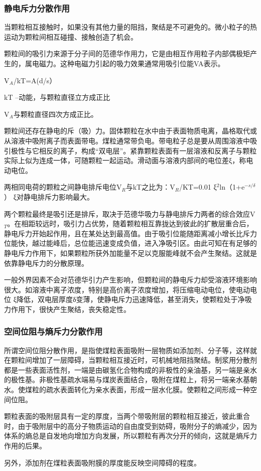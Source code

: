 \documentclass[10pt,openany]{ctexbook}
\begin{document}
 \subsubsection{静电斥力分散作用}
         当颗粒相互接触时，如果没有其他力量的阻挡，聚结是不可避免的。微小粒子的热运动为颗粒间相互碰撞、接触创造了机会。\par
       颗粒间的吸引力来源于分子间的范德华作用力，它是由相互作用粒子内部偶极矩产生的，属电磁力。这种电磁力引起的吸力效果通常用吸引位能VA表示。\par
V$_A$/kT=A(d/s）\par
kT –动能，与颗粒直径立方成正比\par
V$_A$与颗粒直径四次方成正比。\par
颗粒间还存在静电的斥（吸）力。固体颗粒在水中由于表面物质电离，晶格取代或从溶液中吸附离子而表面带电。煤粒通常带负电。带电粒子总是要从周围溶液中吸引极性与它相反的离子，构成“双电层”。紧靠颗粒表面有一层溶液和反离子与颗粒实际上似为连成一体，可随颗粒一起运动。滑动面与溶液内部间的电位差ξ，称电动电位。\par
  两相同电荷的颗粒之间静电排斥电位V$_R$与kT之比为：V$_R$/KT=0.01 ξ$^2$ln（1+e$^{-s/δ}$ ）
ξ对静电排斥力影响最大。 \par
    两个颗粒最终是吸引还是排斥，取决于范德华吸力与静电排斥力两者的综合效应V$_T$。在相距较远时，吸引力占优势，随着颗粒相互靠拢达到彼此的扩散层重合后，静电斥力开始起作用，且在某处达到最高值。由于吸引位能随距离减小增长比斥力位能快，越过能峰后，总位能迅速变成负值，进入净吸引区。由此可知在有足够的静电斥力作用下，如果颗粒所获外加能量不足以克服能峰就不会产生聚结。这就是依靠静电斥力的分散原理。\par
  一般外界因素不会对范德华引力产生影响，但颗粒间的静电斥力却受溶液环境影响很大。如溶液中离子浓度，特别是高价离子浓度增加，将压缩电动电位，使电动电位
ξ降低，双电层厚度δ变薄，使静电斥力迅速降低，甚至消失，使颗粒处于净吸力作用下，很快产生聚结，丧失稳定性。\par
\subsubsection{空间位阻与熵斥力分散作用}
所谓空间位阻分散作用，是指使煤粒表面吸附一层物质如添加剂、分子等，这样就在颗粒间增加了一层障碍，当颗粒相互接近时，可机械地阻挡聚结。制浆用分散剂都是一些表面活性剂，一端是由碳氢化合物构成的非极性的亲油基，另一端是亲水的极性基。非极性基疏水端易与煤炭表面结合，吸附在煤粒上，将另一端亲水基朝水。使煤粒的疏水表面转化为亲水表面，形成一层水化膜。使颗粒之间形成一种空间位阻。\par
    颗粒表面的吸附层具有一定的厚度，当两个带吸附层的颗粒相互接近，彼此重合时，由于吸附层中的高分子物质运动的自由度受到妨碍，吸附分子的熵减少，因为体系的熵总是自发地向增加方向发展，所以颗粒有再次分开的倾向，这就是熵斥力作用的后果。\par
    另外，添加剂在煤粒表面吸附膜的厚度能反映空间障碍的程度。
\end{document}
